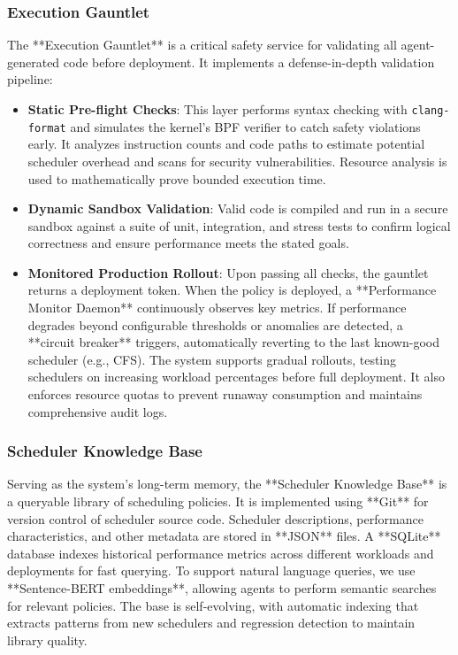 \subsubsection{Execution Gauntlet}
The **Execution Gauntlet** is a critical safety service for validating all agent-generated code before deployment. It implements a defense-in-depth validation pipeline:
\begin{itemize}
    \item \textbf{Static Pre-flight Checks}: This layer performs syntax checking with \texttt{clang-format} and simulates the kernel's BPF verifier to catch safety violations early. It analyzes instruction counts and code paths to estimate potential scheduler overhead and scans for security vulnerabilities. Resource analysis is used to mathematically prove bounded execution time.
    \item \textbf{Dynamic Sandbox Validation}: Valid code is compiled and run in a secure sandbox against a suite of unit, integration, and stress tests to confirm logical correctness and ensure performance meets the stated goals.
    \item \textbf{Monitored Production Rollout}: Upon passing all checks, the gauntlet returns a deployment token. When the policy is deployed, a **Performance Monitor Daemon** continuously observes key metrics. If performance degrades beyond configurable thresholds or anomalies are detected, a **circuit breaker** triggers, automatically reverting to the last known-good scheduler (e.g., CFS). The system supports gradual rollouts, testing schedulers on increasing workload percentages before full deployment. It also enforces resource quotas to prevent runaway consumption and maintains comprehensive audit logs.
\end{itemize}

\subsubsection{Scheduler Knowledge Base}
Serving as the system's long-term memory, the **Scheduler Knowledge Base** is a queryable library of scheduling policies. It is implemented using **Git** for version control of scheduler source code. Scheduler descriptions, performance characteristics, and other metadata are stored in **JSON** files. A **SQLite** database indexes historical performance metrics across different workloads and deployments for fast querying. To support natural language queries, we use **Sentence-BERT embeddings**, allowing agents to perform semantic searches for relevant policies. The base is self-evolving, with automatic indexing that extracts patterns from new schedulers and regression detection to maintain library quality.

